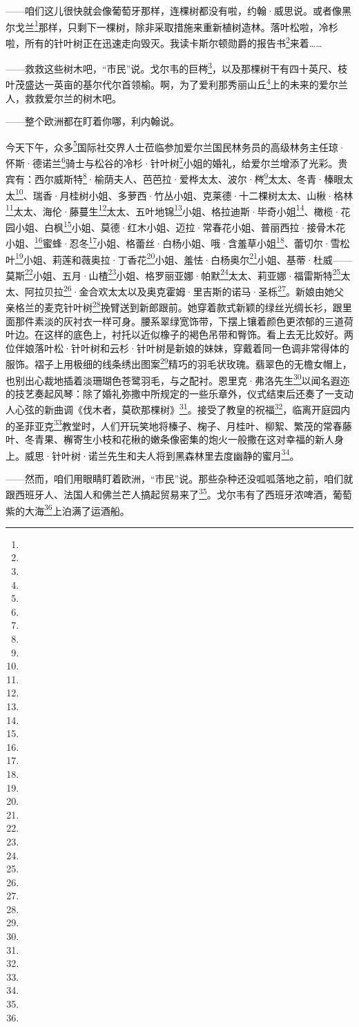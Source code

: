 \par ——咱们这儿很快就会像葡萄牙那样，连棵树都没有啦，约翰·威思说。或者像黑尔戈兰\footnote{}那样，只剩下一棵树，除非采取措施来重新植树造林。落叶松啦，冷杉啦，所有的针叶树正在迅速走向毁灭。我读卡斯尔顿勋爵的报告书\footnote{}来着……
\par ——救救这些树木吧，“市民”说。戈尔韦的巨梣\footnote{}，以及那棵树干有四十英尺、枝叶茂盛达一英亩的基尔代尔首领榆。啊，为了爱利那秀丽山丘\footnote{}上的未来的爱尔兰人，救救爱尔兰的树木吧。
\par ——整个欧洲都在盯着你哪，利内翰说。
\par 今天下午，众多\footnote{}国际社交界人士莅临参加爱尔兰国民林务员的高级林务主任琼·怀斯·德诺兰\footnote{}骑士与松谷的冷杉·针叶树\footnote{}小姐的婚礼，给爱尔兰增添了光彩。贵宾有：西尔威斯特\footnote{}·榆荫夫人、芭芭拉·爱桦太太、波尔·梣\footnote{}太太、冬青·榛眼太太\footnote{}、瑞香·月桂树小姐、多萝西·竹丛小姐、克莱德·十二棵树太太、山楸·格林\footnote{}太太、海伦·藤蔓生\footnote{}太太、五叶地锦\footnote{}小姐、格拉迪斯·毕奇小姐\footnote{}、橄榄·花园小姐、白枫\footnote{}小姐、莫德·红木小姐、迈拉·常春花小姐、普丽西拉·接骨木花小姐、\footnote{}蜜蜂·忍冬\footnote{}小姐、格蕾丝·白杨小姐、哦·含羞草小姐\footnote{}、蕾切尔·雪松叶\footnote{}小姐、莉莲和薇奥拉·丁香花\footnote{}小姐、羞怯·白杨奥尔\footnote{}小姐、基蒂·杜威——莫斯\footnote{}小姐、五月·山楂\footnote{}小姐、格罗丽亚娜·帕默\footnote{}太太、莉亚娜·福雷斯特\footnote{}太太、阿拉贝拉\footnote{}·金合欢太太以及奥克霍姆·里吉斯的诺马·圣栎\footnote{}。新娘由她父亲格兰的麦克针叶树\footnote{}挽臂送到新郎跟前。她穿着款式新颖的绿丝光绸长衫，跟里面那件素淡的灰衬衣一样可身。腰系翠绿宽饰带，下摆上镶着颜色更浓郁的三道荷叶边。在这样的底色上，衬托以近似橡子的褐色吊带和臀饰。看上去无比姣好。两位伴娘落叶松·针叶树和云杉·针叶树是新娘的妹妹，穿戴着同一色调非常得体的服饰。褶子上用极细的线条绣出图案\footnote{}精巧的羽毛状玫瑰。翡翠色的无檐女帽上，也别出心裁地插着淡珊瑚色苍鹭羽毛，与之配衬。恩里克·弗洛先生\footnote{}以闻名遐迩的技艺奏起风琴：除了婚礼弥撒中所规定的一些乐章外，仪式结束后还奏了一支动人心弦的新曲调《伐木者，莫砍那棵树》\footnote{}。接受了教皇的祝福\footnote{}，临离开庭园内的圣菲亚克\footnote{}教堂时，人们开玩笑地将榛子、椈子、月桂叶、柳絮、繁茂的常春藤叶、冬青果、檞寄生小枝和花楸的嫩条像密集的炮火一般撒在这对幸福的新人身上。威思·针叶树·诺兰先生和夫人将到黑森林里去度幽静的蜜月\footnote{}。
\par ——然而，咱们用眼睛盯着欧洲，“市民”说。那些杂种还没呱呱落地之前，咱们就跟西班牙人、法国人和佛兰芒人搞起贸易来了\footnote{}。戈尔韦有了西班牙浓啤酒，葡萄紫的大海\footnote{}上泊满了运酒船。

